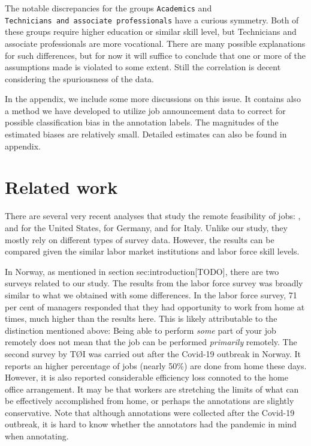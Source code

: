 \documentclass[11pt,]{article}
\begin{document}
The notable discrepancies for the groups \texttt{Academics} and
\texttt{Technicians\ and\ associate\ professionals} have a curious
symmetry. Both of these groups require higher education or similar skill
level, but Technicians and associate professionals are more vocational.
There are many possible explanations for such differences, but for now
it will suffice to conclude that one or more of the assumptions made is
violated to some extent. Still the correlation is decent considering the
spuriousness of the data.

In the appendix, we include some more discussions on this issue. It
contains also a method we have developed to utilize job announcement
data to correct for possible classification bias in the annotation
labels. The magnitudes of the estimated biases are relatively small.
Detailed estimates can also be found in appendix.

\hypertarget{related-work}{%
\section{Related work}\label{related-work}}

There are several very recent analyses that study the remote feasibility
of jobs: \citep{Dingel2020}, \citep{Brynjolfsson2020} and
\citep{Hensivk2020} for the United States, \citep{Alipour2020} for
Germany, and \citep{Barbieri2020} for Italy. Unlike our study, they
mostly rely on different types of survey data. However, the results can
be compared given the similar labor market institutions and labor force
skill levels.

In Norway, as mentioned in section sec:introduction{[}TODO{]}, there are
two surveys related to our study. The results from the labor force
survey was broadly similar to what we obtained with some differences. In
the labor force survey, 71 per cent of managers responded that they had
opportunity to work from home at times, much higher than the results
here. This is likely attributable to the distinction mentioned above:
Being able to perform \emph{some} part of your job remotely does not
mean that the job can be performed \emph{primarily} remotely. The second
survey by TØI was carried out after the Covid-19 outbreak in Norway. It
reports an higher percentage of jobs (nearly 50\%) are done from home
these days. However, it is also reported considerable efficiency loss
connoted to the home office arrangement. It may be that workers are
stretching the limits of what can be effectively accomplished from home,
or perhaps the annotations are slightly conservative. Note that although
annotations were collected after the Covid-19 outbreak, it is hard to
know whether the annotators had the pandemic in mind when annotating.
\end{document}
